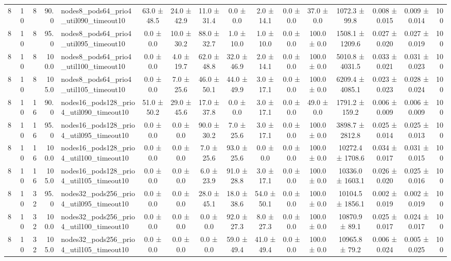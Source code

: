 \begin{tabular}{r r r r l c c c c c c c c c c r}
8 & 10 & 8 & 90.0 & nodes8\_pods64\_prio4\_util090\_timeout10 & 63.0 ± 48.5 & 24.0 ± 42.9 & 11.0 ± 31.4 & 0.0 ± 0.0 & 2.0 ± 14.1 & 0.0 ± 0.0 & 37.0 ± 0.0 & 1072.3 ± 99.8 & 0.008 ± 0.015 & 0.009 ± 0.014 & 100 \\
8 & 10 & 8 & 95.0 & nodes8\_pods64\_prio4\_util095\_timeout10 & 0.0 ± 0.0 & 10.0 ± 30.2 & 88.0 ± 32.7 & 1.0 ± 10.0 & 1.0 ± 10.0 & 0.0 ± 0.0 & 100.0 ± 0.0 & 1508.1 ± 1209.6 & 0.027 ± 0.020 & 0.027 ± 0.019 & 100 \\
8 & 10 & 8 & 100.0 & nodes8\_pods64\_prio4\_util100\_timeout10 & 0.0 ± 0.0 & 4.0 ± 19.7 & 62.0 ± 48.8 & 32.0 ± 46.9 & 2.0 ± 14.1 & 0.0 ± 0.0 & 100.0 ± 0.0 & 5010.8 ± 4031.5 & 0.033 ± 0.021 & 0.031 ± 0.023 & 100 \\
8 & 10 & 8 & 105.0 & nodes8\_pods64\_prio4\_util105\_timeout10 & 0.0 ± 0.0 & 7.0 ± 25.6 & 46.0 ± 50.1 & 44.0 ± 49.9 & 3.0 ± 17.1 & 0.0 ± 0.0 & 100.0 ± 0.0 & 6209.4 ± 4085.1 & 0.023 ± 0.023 & 0.028 ± 0.024 & 100 \\
8 & 10 & 16 & 90.0 & nodes16\_pods128\_prio4\_util090\_timeout10 & 51.0 ± 50.2 & 29.0 ± 45.6 & 17.0 ± 37.8 & 0.0 ± 0.0 & 3.0 ± 17.1 & 0.0 ± 0.0 & 49.0 ± 0.0 & 1791.2 ± 159.2 & 0.006 ± 0.009 & 0.006 ± 0.009 & 100 \\
8 & 10 & 16 & 95.0 & nodes16\_pods128\_prio4\_util095\_timeout10 & 0.0 ± 0.0 & 0.0 ± 0.0 & 90.0 ± 30.2 & 7.0 ± 25.6 & 3.0 ± 17.1 & 0.0 ± 0.0 & 100.0 ± 0.0 & 3898.7 ± 2812.8 & 0.025 ± 0.014 & 0.025 ± 0.013 & 100 \\
8 & 10 & 16 & 100.0 & nodes16\_pods128\_prio4\_util100\_timeout10 & 0.0 ± 0.0 & 0.0 ± 0.0 & 7.0 ± 25.6 & 93.0 ± 25.6 & 0.0 ± 0.0 & 0.0 ± 0.0 & 100.0 ± 0.0 & 10272.4 ± 1708.6 & 0.034 ± 0.017 & 0.031 ± 0.015 & 100 \\
8 & 10 & 16 & 105.0 & nodes16\_pods128\_prio4\_util105\_timeout10 & 0.0 ± 0.0 & 0.0 ± 0.0 & 6.0 ± 23.9 & 91.0 ± 28.8 & 3.0 ± 17.1 & 0.0 ± 0.0 & 100.0 ± 0.0 & 10336.0 ± 1603.1 & 0.026 ± 0.020 & 0.025 ± 0.016 & 100 \\
8 & 10 & 32 & 95.0 & nodes32\_pods256\_prio4\_util095\_timeout10 & 0.0 ± 0.0 & 0.0 ± 0.0 & 28.0 ± 45.1 & 18.0 ± 38.6 & 54.0 ± 50.1 & 0.0 ± 0.0 & 100.0 ± 0.0 & 10104.5 ± 1856.1 & 0.002 ± 0.019 & 0.002 ± 0.019 & 100 \\
8 & 10 & 32 & 100.0 & nodes32\_pods256\_prio4\_util100\_timeout10 & 0.0 ± 0.0 & 0.0 ± 0.0 & 0.0 ± 0.0 & 92.0 ± 27.3 & 8.0 ± 27.3 & 0.0 ± 0.0 & 100.0 ± 0.0 & 10870.9 ± 89.1 & 0.025 ± 0.017 & 0.024 ± 0.017 & 100 \\
8 & 10 & 32 & 105.0 & nodes32\_pods256\_prio4\_util105\_timeout10 & 0.0 ± 0.0 & 0.0 ± 0.0 & 0.0 ± 0.0 & 59.0 ± 49.4 & 41.0 ± 49.4 & 0.0 ± 0.0 & 100.0 ± 0.0 & 10965.8 ± 79.2 & 0.006 ± 0.024 & 0.005 ± 0.025 & 100 \\

\end{tabular}
